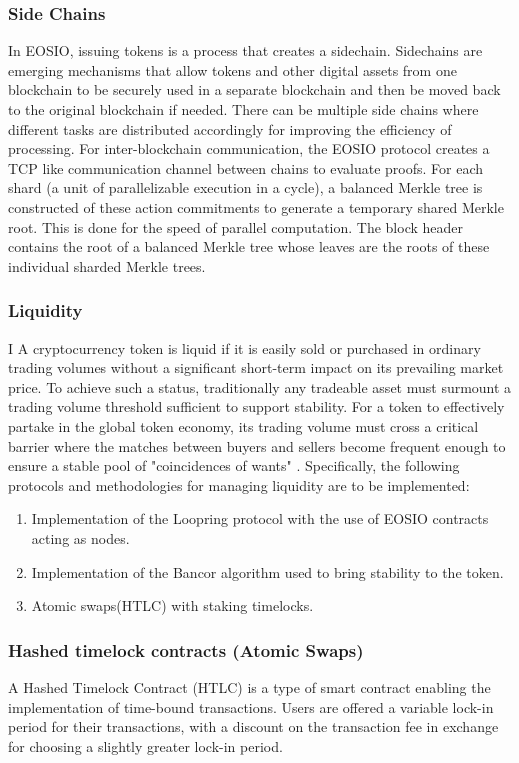 \documentclass[]{article}
\begin{document}
{	\subsubsection{Side Chains}
	In EOSIO, issuing tokens is a process that creates a sidechain. 
	Sidechains are emerging mechanisms that allow tokens and other digital assets from one blockchain to be securely used in a separate blockchain and then be moved back to the original blockchain if needed. 
	There can be multiple side chains where different tasks are distributed accordingly for improving the efficiency of processing.     
	For inter-blockchain communication, the EOSIO protocol creates a TCP like communication channel between chains to evaluate proofs.
	For each shard (a unit of parallelizable execution in a cycle), a balanced Merkle tree is constructed of these action commitments to generate a temporary shared Merkle root. 
	This is done for the speed of parallel computation. 
	The block header contains the root of a balanced Merkle tree whose leaves are the roots of these individual sharded Merkle trees.
	\cite{3} 
	
	
	\subsubsection{Liquidity}
	I
	 A cryptocurrency token is liquid if it is easily sold or purchased in ordinary trading volumes without a significant short-term impact on its prevailing market price. To achieve such a status, traditionally any tradeable asset must surmount a trading volume threshold sufficient to support stability. 
	 For a token to effectively partake in the global token economy, its trading volume must cross a critical barrier where the matches between buyers and sellers become frequent enough to ensure a stable pool of "coincidences of wants" \cite{10}. 
	 Specifically, the following protocols and methodologies for managing liquidity are to be implemented: 
  
    \begin{enumerate} 
	\item Implementation of the Loopring protocol with the use of EOSIO contracts acting as nodes.\cite{7}
	\item Implementation of the Bancor algorithm used to bring stability to the token.\cite{10}
	\item Atomic swaps(HTLC) with staking timelocks. 
\end{enumerate}

\subsubsection{Hashed timelock contracts (Atomic Swaps)}
A Hashed Timelock Contract (HTLC)\cite{22} is a type of smart contract enabling the implementation of time-bound transactions.
Users are offered a variable lock-in period for their transactions, 
with a discount on the transaction fee in exchange for choosing a slightly greater lock-in period.

}
\end{document}
